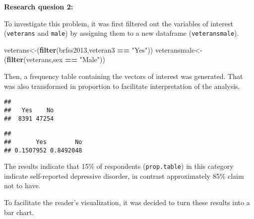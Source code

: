 \documentclass[]{article}
\newenvironment{Shaded}{\begin{snugshade}}{\end{snugshade}}
\newcommand{\DataTypeTok}[1]{\textcolor[rgb]{0.13,0.29,0.53}{#1}}
\newcommand{\KeywordTok}[1]{\textcolor[rgb]{0.13,0.29,0.53}{\textbf{#1}}}
\newcommand{\NormalTok}[1]{#1}
\newcommand{\OperatorTok}[1]{\textcolor[rgb]{0.81,0.36,0.00}{\textbf{#1}}}
\newcommand{\StringTok}[1]{\textcolor[rgb]{0.31,0.60,0.02}{#1}}
\begin{document}
\textbf{Research quesion 2:}

To investigate this problem, it was first filtered out the variables of
interest (\texttt{veterans} and \texttt{male}) by assigning them to a
new dataframe (\texttt{veteransmale}).

\begin{Shaded}
\begin{Highlighting}[]
\NormalTok{veterans<-(}\KeywordTok{filter}\NormalTok{(brfss2013,veteran3 }\OperatorTok{==}\StringTok{ "Yes"}\NormalTok{))}
\NormalTok{veteransmale<-(}\KeywordTok{filter}\NormalTok{(veterans,sex }\OperatorTok{==}\StringTok{ "Male"}\NormalTok{))}
\end{Highlighting}
\end{Shaded}

Then, a frequency table containing the vectors of interest was
generated. That was also transformed in proportion to facilitate
interpretation of the analysis.

\begin{Shaded}
\end{Shaded}

\begin{verbatim}
## 
##   Yes    No 
##  8391 47254
\end{verbatim}

\begin{Shaded}
\end{Shaded}

\begin{verbatim}
## 
##       Yes        No 
## 0.1507952 0.8492048
\end{verbatim}

The results indicate that 15\% of respondents (\texttt{prop.table}) in
this category indicate self-reported depressive disorder, in contrast
approximately 85\% claim not to have.

To facilitate the reader's visualization, it was decided to turn these
results into a bar chart.

\begin{Shaded}
\end{Shaded}
\end{document}
